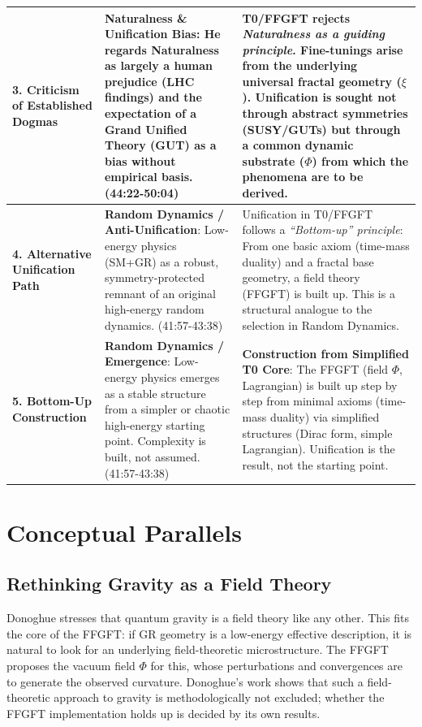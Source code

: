 \begin{longtable}{p{} p{} p{}}
		\textbf{3. Criticism of Established Dogmas} & 
		\textbf{Naturalness \& Unification Bias}: He regards Naturalness as largely a human prejudice (LHC findings) and the expectation of a Grand Unified Theory (GUT) as a bias without empirical basis. \cite{DonoghueInterview2025} (44:22-50:04) & 
		T0/FFGFT rejects \emph{Naturalness as a guiding principle}. Fine-tunings arise from the underlying universal fractal geometry ($\xi$). Unification is sought not through abstract symmetries (SUSY/GUTs) but through a common dynamic substrate ($\Phi$) from which the phenomena are to be derived. \\
		\midrule
		
		\textbf{4. Alternative Unification Path} & 
		\textbf{Random Dynamics / Anti-Unification}: Low-energy physics (SM+GR) as a robust, symmetry-protected remnant of an original high-energy random dynamics. \cite{DonoghueInterview2025} (41:57-43:38) & 
		Unification in T0/FFGFT follows a \emph{``Bottom-up'' principle}: From one basic axiom (time-mass duality) and a fractal base geometry, a field theory (FFGFT) is built up. This is a structural analogue to the selection in Random Dynamics. \\
		\midrule
		
		\textbf{5. Bottom-Up Construction} & 
		\textbf{Random Dynamics / Emergence}: Low-energy physics emerges as a stable structure from a simpler or chaotic high-energy starting point. Complexity is built, not assumed. \cite{DonoghueInterview2025} (41:57-43:38) & 
		\textbf{Construction from Simplified T0 Core}: The FFGFT (field $\Phi$, Lagrangian) is built up step by step from minimal axioms (time-mass duality) via simplified structures (Dirac form, simple Lagrangian). Unification is the result, not the starting point. \\
		
	\end{longtable}
	
	\section{Conceptual Parallels}
	
	\subsection{Rethinking Gravity as a Field Theory}
	
	Donoghue stresses that quantum gravity is a field theory like any other. This fits the core of the FFGFT: if GR geometry is a low-energy effective description, it is natural to look for an underlying field-theoretic microstructure. The FFGFT proposes the vacuum field $\Phi$ for this, whose perturbations and convergences are to generate the observed curvature. Donoghue's work shows that such a field-theoretic approach to gravity is methodologically not excluded; whether the FFGFT implementation holds up is decided by its own results.
	
